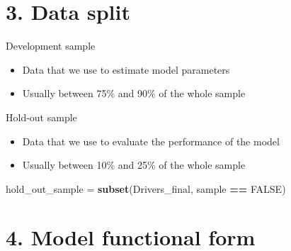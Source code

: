 \documentclass[9pt,ignorenonframetext,]{beamer}
\newenvironment{Shaded}{\begin{snugshade}}{\end{snugshade}}
\newcommand{\KeywordTok}[1]{\textcolor[rgb]{0.13,0.29,0.53}{\textbf{#1}}}
\newcommand{\DataTypeTok}[1]{\textcolor[rgb]{0.13,0.29,0.53}{#1}}
\newcommand{\DecValTok}[1]{\textcolor[rgb]{0.00,0.00,0.81}{#1}}
\newcommand{\StringTok}[1]{\textcolor[rgb]{0.31,0.60,0.02}{#1}}
\newcommand{\OtherTok}[1]{\textcolor[rgb]{0.56,0.35,0.01}{#1}}
\newcommand{\OperatorTok}[1]{\textcolor[rgb]{0.81,0.36,0.00}{\textbf{#1}}}
\newcommand{\NormalTok}[1]{#1}
\providecommand{\tightlist}{%
  \setlength{\itemsep}{0pt}\setlength{\parskip}{0pt}}
\begin{document}
\section{3. Data split}\label{data-split}

\begin{frame}[fragile]{Development sample}

\begin{itemize}
\tightlist
\item
  Data that we use to estimate model parameters
\item
  Usually between 75\% and 90\% of the whole sample
\end{itemize}

\begin{Shaded}
\end{Shaded}

\end{frame}

\begin{frame}[fragile]{Hold-out sample}

\begin{itemize}
\tightlist
\item
  Data that we use to evaluate the performance of the model
\item
  Usually between 10\% and 25\% of the whole sample
\end{itemize}

\begin{Shaded}
\begin{Highlighting}[]
\NormalTok{hold_out_sample  =}\StringTok{ }\KeywordTok{subset}\NormalTok{(Drivers_final, sample }\OperatorTok{==}\StringTok{ }\OtherTok{FALSE}\NormalTok{)}
\end{Highlighting}
\end{Shaded}

\end{frame}

\section{4. Model functional form}\label{model-functional-form}
\end{document}

